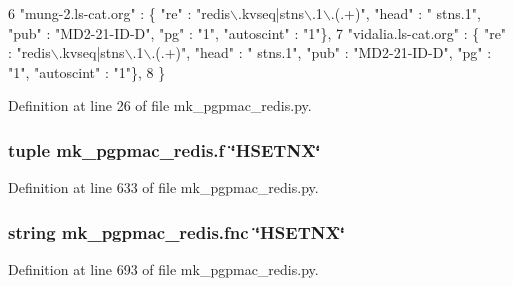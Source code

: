 \begin{DoxyCode}
6     \textcolor{stringliteral}{"mung-2.ls-cat.org"}   : \{ \textcolor{stringliteral}{"re"} : \textcolor{stringliteral}{"redis\(\backslash\).kvseq|stns\(\backslash\).1\(\backslash\).(.+)"}, \textcolor{stringliteral}{"head"} : \textcolor{stringliteral}{"
      stns.1"}, \textcolor{stringliteral}{"pub"} : \textcolor{stringliteral}{"MD2-21-ID-D"}, \textcolor{stringliteral}{"pg"} : \textcolor{stringliteral}{"1"}, \textcolor{stringliteral}{"autoscint"} : \textcolor{stringliteral}{"1"}\},
7     \textcolor{stringliteral}{"vidalia.ls-cat.org"}  : \{ \textcolor{stringliteral}{"re"} : \textcolor{stringliteral}{"redis\(\backslash\).kvseq|stns\(\backslash\).1\(\backslash\).(.+)"}, \textcolor{stringliteral}{"head"} : \textcolor{stringliteral}{"
      stns.1"}, \textcolor{stringliteral}{"pub"} : \textcolor{stringliteral}{"MD2-21-ID-D"}, \textcolor{stringliteral}{"pg"} : \textcolor{stringliteral}{"1"}, \textcolor{stringliteral}{"autoscint"} : \textcolor{stringliteral}{"1"}\},
8 \}
\end{DoxyCode}


Definition at line 26 of file mk\-\_\-pgpmac\-\_\-redis.\-py.

\hypertarget{namespacemk__pgpmac__redis_a057fe7457503e0de97edcf855591ed58}{
\subsubsection[{f}]{\setlength{\rightskip}{0pt plus 5cm}tuple mk\-\_\-pgpmac\-\_\-redis.\-f \char`\"{}H\-S\-E\-T\-N\-X\char`\"{}}}\label{namespacemk__pgpmac__redis_a057fe7457503e0de97edcf855591ed58}


Definition at line 633 of file mk\-\_\-pgpmac\-\_\-redis.\-py.

\hypertarget{namespacemk__pgpmac__redis_a654b54ba0758b8b84516938260851129}{
\subsubsection[{fnc}]{\setlength{\rightskip}{0pt plus 5cm}string mk\-\_\-pgpmac\-\_\-redis.\-fnc \char`\"{}H\-S\-E\-T\-N\-X\char`\"{}}}\label{namespacemk__pgpmac__redis_a654b54ba0758b8b84516938260851129}


Definition at line 693 of file mk\-\_\-pgpmac\-\_\-redis.\-py.

